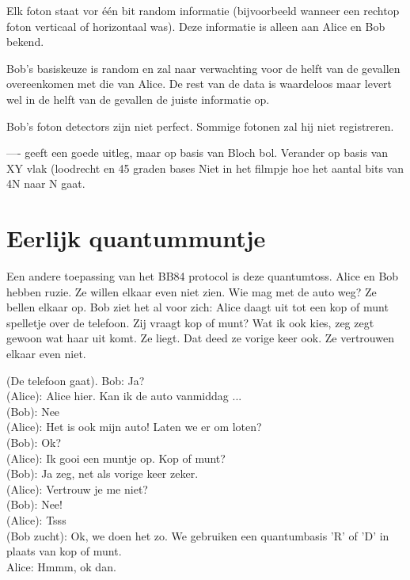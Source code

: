 \documentclass[../../main.tex]{subfiles}
\begin{document}
Elk foton staat vor \'e\'en bit random informatie (bijvoorbeeld wanneer een rechtop foton verticaal of horizontaal was). Deze informatie is alleen aan Alice en Bob bekend.


Bob's basiskeuze is random en zal naar verwachting voor de helft van de gevallen overeenkomen met die van Alice. De rest van de data is waardeloos maar levert wel in de helft van de gevallen de juiste informatie op.

Bob's foton detectors zijn niet perfect. Sommige fotonen zal hij niet registreren.

----
 geeft een goede uitleg, maar op basis van Bloch bol.
Verander op basis van XY vlak (loodrecht en 45 graden bases 
Niet in het filmpje hoe het aantal bits van 4N naar N gaat.
\fi%

\section{Eerlijk quantummuntje}
Een andere toepassing van het BB84 protocol is deze quantumtoss. Alice en Bob hebben ruzie. Ze willen elkaar even niet zien. Wie mag met de auto weg? Ze bellen elkaar op. Bob ziet het al voor zich:
Alice daagt uit tot een kop of munt spelletje over de telefoon. Zij vraagt kop of munt? Wat ik ook kies, zeg zegt gewoon wat haar uit komt. Ze liegt. Dat deed ze vorige keer ook. Ze vertrouwen elkaar even niet.

(De telefoon gaat). Bob: Ja?\\
(Alice): Alice hier. Kan ik de auto vanmiddag ...\\
(Bob): Nee\\
(Alice): Het is ook mijn auto! Laten we er om loten?\\
(Bob): Ok?\\
(Alice): Ik gooi een muntje op. Kop of munt?\\
(Bob): Ja zeg, net als vorige keer zeker.\\
(Alice): Vertrouw je me niet?\\
(Bob): Nee!\\
(Alice): Tsss\\
(Bob zucht): Ok, we doen het zo. We gebruiken een quantumbasis 'R' of 'D' in plaats van kop of munt.\\
Alice: Hmmm, ok dan.\\
 
\end{document}
